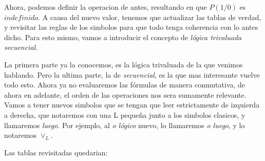 \documentclass{article}
\begin{document}
Ahora, podemos definir la operacion de antes, resultando en que $P(1/0)$ es $indefinido$. A causa del nuevo valor, tenemos que actualizar las tablas de verdad, y revisitar las reglas de los simbolos para que todo tenga coherencia con lo antes dicho. Para esto mismo, vamos a introducir el concepto de \textit{lógica trivaluada secuencial}.

La primera parte ya la conocemos, es la lógica trivaluada de la que venimos hablando. Pero la ultima parte, la de \textit{secuencial}, es la que mas interesante vuelve todo esto. Ahora ya no evaluaremos las fórmulas de manera conmutativa, de ahora en adelante, el orden de las operaciones nos sera sumamente relevante. Vamos a tener nuevos simbolos que se tengan que leer estrictamente de izquierda a derecha, que notaremos con una L pequeña junto a los simbolos clasicos, y llamaremos \textit{luego}. Por ejemplo, al \textit{o lógico} nuevo, lo llamaremos \textit{o luego}, y lo notaremos $\lor_{L}$.

Las tablas revisitadas quedarian:
\end{document}
